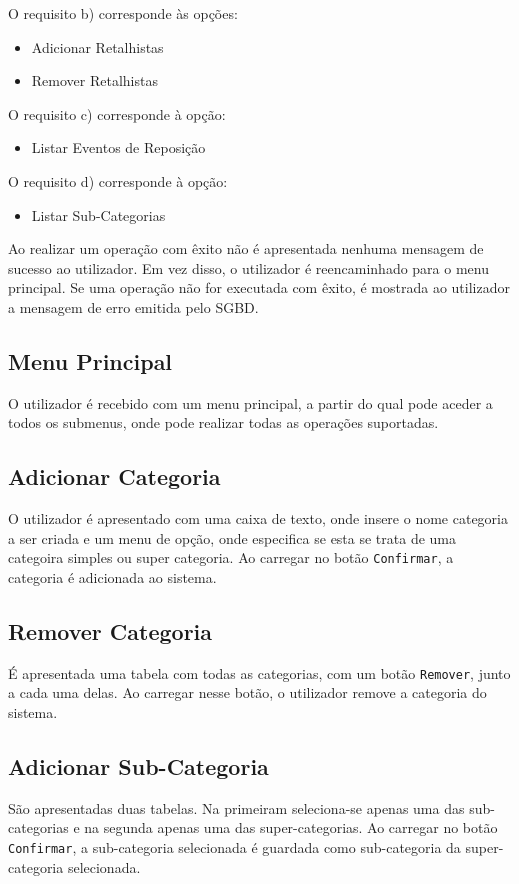 \documentclass{article}
\begin{document}
O requisito b) corresponde às opções:
\begin{itemize}[leftmargin=+1.5cm]
	\item Adicionar Retalhistas
	\item Remover Retalhistas
\end{itemize}

O requisito c) corresponde à opção:
\begin{itemize}[leftmargin=+1.5cm]
	\item Listar Eventos de Reposição
\end{itemize}

O requisito d) corresponde à opção:
\begin{itemize}[leftmargin=+1.5cm]
	\item Listar Sub-Categorias
\end{itemize}

Ao realizar um operação com êxito não é apresentada nenhuma mensagem de sucesso
ao utilizador. Em vez disso, o utilizador é reencaminhado para o menu principal.
Se uma operação não for executada com êxito, é mostrada ao utilizador a mensagem
de erro emitida pelo SGBD.


\subsection{Menu Principal}
O utilizador é recebido com um menu principal, a partir do qual pode aceder a
todos os submenus, onde pode realizar todas as operações suportadas.

\subsection{Adicionar Categoria}
O utilizador é apresentado com uma caixa de texto, onde insere o nome categoria
a ser criada e um menu de opção, onde especifica se esta se trata de uma categoira
simples ou super categoria. Ao carregar no botão \texttt{Confirmar}, a categoria
é adicionada ao sistema.

\subsection{Remover Categoria}
É apresentada uma tabela com todas as categorias, com um botão \texttt{Remover},
junto a cada uma delas. Ao carregar nesse botão, o utilizador remove a categoria
do sistema.

\subsection{Adicionar Sub-Categoria}
São apresentadas duas tabelas. Na primeiram seleciona-se apenas uma das
sub-categorias e na segunda apenas uma das super-categorias. Ao carregar no botão
\texttt{Confirmar}, a sub-categoria selecionada é guardada como sub-categoria da
super-categoria selecionada.
\end{document}
